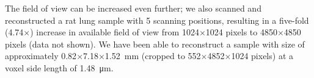 The field of view can be increased even further; we also scanned and reconstructed a rat lung sample with 5 scanning positions, resulting in a five-fold (4.74$\times$) increase in available field of view from 1024$\times$1024 pixels to 4850$\times$4850 pixels (data not shown). We have been able to reconstruct a sample with size of approximately 0.82$\times$7.18$\times$\SI{1.52}{\milli\meter} (cropped to 552$\times$4852$\times$1024 pixels) at a voxel side length of \SI{1.48}{\micro\meter}.